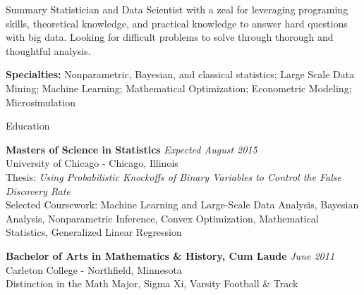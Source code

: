 \documentclass{resume} %
\begin{document}

\begin{rSection}{Summary}
Statistician and Data Scientist with a zeal for leveraging programing skills, theoretical knowledge, and practical knowledge to answer hard questions with big data. Looking for difficult problems to solve through thorough and thoughtful analysis.

{\bf Specialties:} Nonparametric, Bayesian, and classical statistics; Large Scale Data Mining; Machine Learning; Mathematical Optimization; Econometric Modeling; Microsimulation
\end{rSection}



\begin{rSection}{Education}

    {\bf Masters of Science in Statistics} \hfill {\em Expected August 2015} \\
    University of Chicago - Chicago, Illinois \\
    Thesis: {\em Using Probabilistic Knockoffs of Binary Variables to Control the False Discovery Rate} \\
    Selected Coursework: Machine Learning and Large-Scale Data Analysis, Bayesian Analysis, Nonparametric Inference, Convex Optimization, Mathematical Statistics, Generalized Linear Regression


    {\bf Bachelor of Arts in Mathematics \& History, Cum Laude} \hfill {\em June 2011} \\ 
    Carleton College - Northfield, Minnesota  \\
    Distinction in the Math Major, Sigma Xi, Varsity Football \& Track
\end{rSection}

\end{document}
